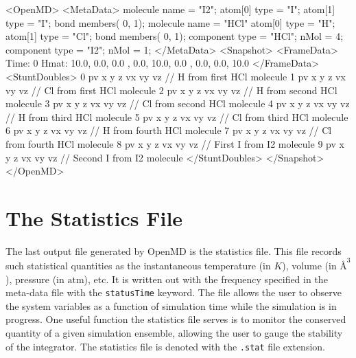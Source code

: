 \documentclass[]{book}
\begin{document}
\begin{code}[caption={Example declaration of the
$\text{I}_2$ molecule and the HCl molecule in {\tt <MetaData>} and
{\tt <Snapshot>} blocks.  Note that even though $\text{I}_2$ is
declared before HCl, the {\tt <Snapshot>} block follows the order {\it in
which the components were included}.}, label=sch:initEx1] 
<OpenMD>
  <MetaData>
molecule{
  name = "I2";
  atom[0]{ type = "I"; }
  atom[1]{ type = "I"; }
  bond{ members( 0, 1); }
}
molecule{
  name = "HCl"
  atom[0]{ type = "H";}
  atom[1]{ type = "Cl";}
  bond{ members( 0, 1); }
}
component{
  type = "HCl";
  nMol = 4;
}
component{
  type = "I2";
  nMol = 1;
}
  </MetaData>
  <Snapshot>
    <FrameData>
        Time: 0
        Hmat: {{ 10.0, 0.0, 0.0 }, { 0.0, 10.0, 0.0 }, { 0.0, 0.0, 10.0 }}
    </FrameData>
    <StuntDoubles>
         0      pv          x y z vx vy vz // H from first HCl molecule 
         1      pv          x y z vx vy vz // Cl from first HCl molecule
         2      pv          x y z vx vy vz // H from second HCl molecule 
         3      pv          x y z vx vy vz // Cl from second HCl molecule
         4      pv          x y z vx vy vz // H from third HCl molecule 
         5      pv          x y z vx vy vz // Cl from third HCl molecule
         6      pv          x y z vx vy vz // H from fourth HCl molecule 
         7      pv          x y z vx vy vz // Cl from fourth HCl molecule
         8      pv          x y z vx vy vz // First I from I2 molecule
         9      pv          x y z vx vy vz // Second I from I2 molecule
    </StuntDoubles>
  </Snapshot>
</OpenMD>
\end{code}

\section{The Statistics File}

The last output file generated by {\sc OpenMD} is the statistics
file. This file records such statistical quantities as the
instantaneous temperature (in $K$), volume (in $\mbox{\AA}^{3}$),
pressure (in $\mbox{atm}$), etc. It is written out with the frequency
specified in the meta-data file with the
\texttt{statusTime} keyword. The file allows the user to observe the
system variables as a function of simulation time while the simulation
is in progress. One useful function the statistics file serves is to
monitor the conserved quantity of a given simulation ensemble,
allowing the user to gauge the stability of the integrator. The
statistics file is denoted with the \texttt{.stat} file extension.
\end{document}
